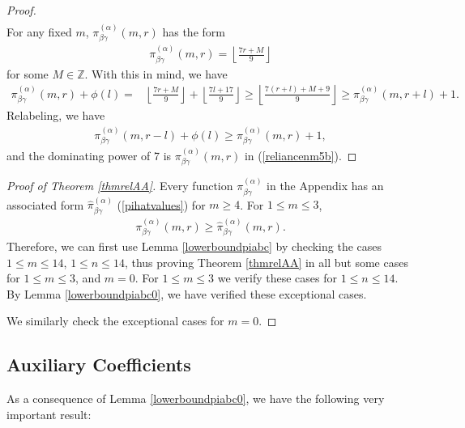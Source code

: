 \documentclass[reqno]{amsart}
\theoremstyle{definition}
\theoremstyle{remark}
\numberwithin{equation}{section}
\begin{document}
\begin{proof}
\begin{align}
\end{align}  For any fixed $m$, $\pi^{(\alpha)}_{\beta\gamma}(m,r)$ has the form
\begin{align*}
\pi^{(\alpha)}_{\beta\gamma}(m,r) = \left\lfloor \frac{7r+M}{9} \right\rfloor
\end{align*} for some $M\in\mathbb{Z}$.  With this in mind, we have
\begin{align*}
\pi^{(\alpha)}_{\beta\gamma}(m,r) + \phi(l) =& \left\lfloor \frac{7r+M}{9} \right\rfloor + \left\lfloor \frac{7l+17}{9} \right\rfloor\ge \left\lfloor \frac{7(r+l)+M+9}{9} \right\rfloor\ge \pi^{(\alpha)}_{\beta\gamma}(m,r+l) + 1.
\end{align*}  Relabeling, we have
\begin{align*}
\pi^{(\alpha)}_{\beta\gamma}(m,r-l) + \phi(l) \ge \pi^{(\alpha)}_{\beta\gamma}(m,r) + 1,
\end{align*} and the dominating power of 7 is $\pi^{(\alpha)}_{\beta\gamma}(m,r)$ in (\ref{reliancenm5b}).
\end{proof}

\begin{proof}[Proof of Theorem \ref{thmrelAA}]
Every function $\pi^{(\alpha)}_{\beta\gamma}$ in the Appendix has an associated form $\hat{\pi}^{(\alpha)}_{\beta\gamma}$ (\ref{pihatvalues}) for $m\ge 4$.  For $1\le m\le 3$,
\begin{align*}
\pi^{(\alpha)}_{\beta\gamma}(m,r)\ge\hat{\pi}^{(\alpha)}_{\beta\gamma}(m,r).
\end{align*}  Therefore, we can first use Lemma \ref{lowerboundpiabc} by checking the cases $1\le m\le 14$, $1\le n\le 14$, thus proving Theorem \ref{thmrelAA} in all but some cases for $1\le m\le 3$, and $m=0$.  For $1\le m\le 3$ we verify these cases for $1\le n\le 14$.  By Lemma \ref{lowerboundpiabc0}, we have verified these exceptional cases.

We similarly check the exceptional cases for $m=0$.
\end{proof}

\subsection{Auxiliary Coefficients}

As a consequence of Lemma \ref{lowerboundpiabc0}, we have the following very important result:
\end{document}
